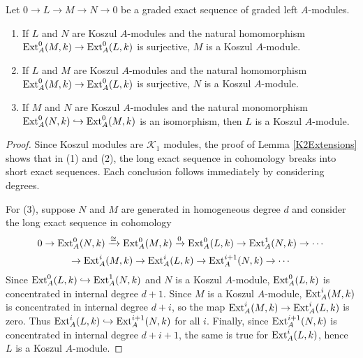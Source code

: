 \documentclass[11pt,righttag]{amsart}
\begin{document}
\begin{lemma}
\label{KoszulExtensions}
Let $0\rightarrow L\rightarrow M\rightarrow N\rightarrow 0$ be a graded exact sequence of graded left $A$-modules.
\begin{enumerate}
\item If $L$ and $N$ are Koszul $A$-modules and the natural homomorphism ${{\hbox{{\rm Ext}}}_A^0(M,k)\rightarrow {\hbox{{\rm Ext}}}_A^0(L,k)}$ is surjective,  $M$ is a Koszul $A$-module.
\item If $L$ and $M$ are Koszul $A$-modules and the natural homomorphism ${{\hbox{{\rm Ext}}}_A^0(M,k)\rightarrow {\hbox{{\rm Ext}}}_A^0(L,k)}$ is surjective,  $N$ is a Koszul $A$-module.
\item If $M$ and $N$ are Koszul $A$-modules and the natural monomorphism ${\hbox{{\rm Ext}}}_A^0(N,k)\hookrightarrow {\hbox{{\rm Ext}}}_A^0(M,k)$ is an isomorphism, then $L$ is a Koszul $A$-module.
\end{enumerate}
\end{lemma}

\begin{proof}
Since Koszul modules are ${{\mathcal K}}_1$ modules, the proof of Lemma \ref{K2Extensions} shows that in (1) and (2), the long exact sequence in cohomology breaks into short exact sequences. Each conclusion follows immediately by considering degrees.

 For (3), suppose $N$ and $M$ are generated in homogeneous degree $d$ and consider the long exact sequence in cohomology
$$0\rightarrow {\hbox{{\rm Ext}}}_A^0(N,k)\xrightarrow{\cong} {\hbox{{\rm Ext}}}_A^0(M,k)\xrightarrow{0} {\hbox{{\rm Ext}}}_A^0(L,k)\rightarrow {\hbox{{\rm Ext}}}_A^1(N,k)\rightarrow \cdots$$
$$\rightarrow{\hbox{{\rm Ext}}}_A^i(M,k)\rightarrow {\hbox{{\rm Ext}}}_A^i(L,k)\rightarrow {\hbox{{\rm Ext}}}_A^{i+1}(N,k)\rightarrow\cdots$$
Since ${\hbox{{\rm Ext}}}_A^0(L,k)\hookrightarrow {\hbox{{\rm Ext}}}_A^1(N,k)$ and $N$ is a Koszul $A$-module, ${\hbox{{\rm Ext}}}_A^0(L,k)$ is concentrated in internal degree $d+1$. Since $M$ is a Koszul $A$-module, ${\hbox{{\rm Ext}}}_A^i(M,k)$ is concentrated in internal degree $d+i$, so  the map ${\hbox{{\rm Ext}}}_A^i(M,k)\rightarrow{\hbox{{\rm Ext}}}_A^i(L,k)$ is zero. Thus ${\hbox{{\rm Ext}}}_A^i(L,k)\hookrightarrow {\hbox{{\rm Ext}}}_A^{i+1}(N,k)$ for all $i$. Finally, since ${\hbox{{\rm Ext}}}_A^{i+1}(N,k)$ is concentrated in internal degree $d+i+1$, the same is true for ${\hbox{{\rm Ext}}}_A^i(L,k)$, hence $L$ is a Koszul $A$-module.
\end{proof}
\end{document}
